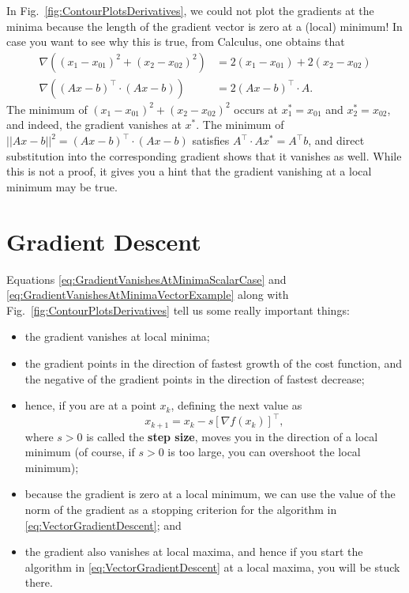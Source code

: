 In Fig.~\ref{fig:ContourPlotsDerivatives}, we could not plot the gradients at the minima because the length of the gradient vector is zero at a (local) minimum! In case you want to see why this is true, from Calculus, one obtains that
    \begin{align}
        \label{eq:GradientVanishesAtMinimaScalarCase}
    \nabla \left((x_1-x_{01})^2 + (x_2-x_{02})^2 \right) &= 2 (x_1-x_{01}) + 2(x_2-x_{02}) \\
        \label{eq:GradientVanishesAtMinimaVectorExample}
    \nabla \left( (Ax-b)^\top \cdot (Ax-b) \right) & = 2 (Ax-b)^\top\cdot A.
    \end{align}
The minimum of $(x_1-x_{01})^2 + (x_2-x_{02})^2$ occurs at $x_1^\ast=x_{01}$ and $x_2^\ast=x_{02}$, and indeed, the gradient vanishes at $x^\ast$. The minimum of $||Ax-b||^2 = (Ax-b)^\top \cdot (Ax-b)$ satisfies $A^\top \cdot A x^\ast = A^\top b$, and direct substitution into the corresponding gradient shows that it vanishes as well. While this is not a proof, it gives you a hint that the gradient vanishing at a local minimum may be true.


\section{Gradient Descent}
\label{sec:GradientDescent}



\begin{tcolorbox}[sharp corners, colback=green!30, colframe=green!80!blue,title=\textbf{Gradient Descent}]

Equations \eqref{eq:GradientVanishesAtMinimaScalarCase} and \eqref{eq:GradientVanishesAtMinimaVectorExample} along with Fig.~\ref{fig:ContourPlotsDerivatives} tell us some really important things:
\begin{itemize}
\item the gradient vanishes at local minima;
    \item the gradient points in the direction of fastest growth of the cost function, and the negative of the gradient points in the direction of fastest decrease;
    \item hence, if you are at a point $x_k$, defining the next value as
\begin{equation}
    \label{eq:VectorGradientDescent}
    x_{k+1}=x_k - s \left[ \nabla f(x_k) \right]^\top,
    \end{equation}
    where $s>0$ is called the \textbf{step size}, moves you in the direction of a local minimum (of course, if $s>0$ is too large, you can overshoot the local minimum); 
    \item because the gradient is zero at a local minimum, we can use the value of the norm of the gradient as a stopping criterion for the algorithm in \eqref{eq:VectorGradientDescent}; and
    \item the gradient also vanishes at local maxima, and hence if you start the algorithm in \eqref{eq:VectorGradientDescent} at a local maxima, you will be stuck there.
\end{itemize}

\end{tcolorbox}

